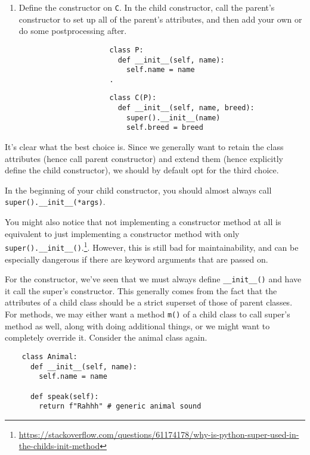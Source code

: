 \begin{enumerate}
    \item Define the constructor on \texttt{C}. In the child constructor, call the parent's constructor to set up all of the parent's attributes, and then add your own or do some postprocessing after. 

    \begin{figure}[H]
      \centering
      \begin{subfigure}[b]{0.48\textwidth}
        \centering
        \begin{lstlisting}
          class P: 
            def __init__(self, name): 
              self.name = name
          .
        \end{lstlisting}
        \caption{}
      \end{subfigure}
      \hfill 
      \begin{subfigure}[b]{0.48\textwidth}
        \centering
        \begin{lstlisting}
          class C(P): 
            def __init__(self, name, breed): 
              super().__init__(name)
              self.breed = breed
        \end{lstlisting}
        \caption{}
      \end{subfigure}
      \caption{}
    \end{figure}
  \end{enumerate}

  It's clear what the best choice is. Since we generally want to retain the class attributes (hence call parent constructor) and extend them (hence explicitly define the child constructor), we should by default opt for the third choice. 

  \begin{theorem}[Heuristic]
    In the beginning of your child constructor, you should almost always call \texttt{super().\_\_init\_\_(*args)}. 
  \end{theorem} 

  You might also notice that not implementing a constructor method at all is equivalent to just implementing a constructor method with only \texttt{super().\_\_init\_\_()}.\footnote{\href{https://stackoverflow.com/questions/61174178/why-is-python-super-used-in-the-childs-init-method}{https://stackoverflow.com/questions/61174178/why-is-python-super-used-in-the-childs-init-method}}. However, this is still bad for maintainability, and can be especially dangerous if there are keyword arguments that are passed on. 

  For the constructor, we've seen that we must always define \texttt{\_\_init\_\_()} and have it call the super's constructor. This generally comes from the fact that the attributes of a child class should be a strict superset of those of parent classes. For methods, we may either want a method \texttt{m()} of a child class to call super's method as well, along with doing additional things, or we might want to completely override it. Consider the animal class again. 
  \begin{lstlisting}
    class Animal: 
      def __init__(self, name):
        self.name = name
      
      def speak(self):
        return f"Rahhh" # generic animal sound
  \end{lstlisting} 

